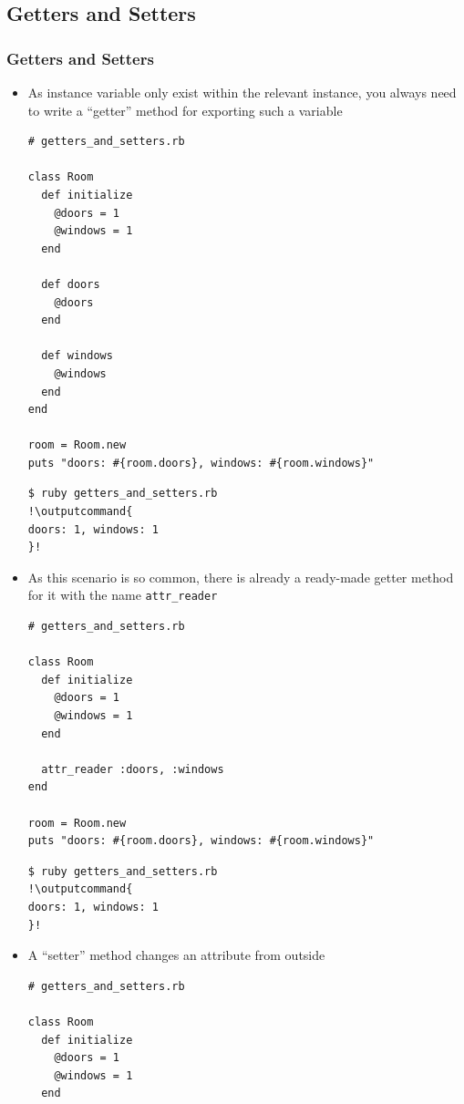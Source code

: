 \documentclass{beamer}
\newcommand{\outputcommand}[1]{\color{darkgreen}{#1}}
\begin{document}
\subsection{Getters and Setters}
\begin{frame}
\frametitle{Getters and Setters}
\begin{itemize}
 \item As instance variable only exist within the relevant instance, you always need to write a ``getter'' method for exporting such a variable
\lstset{language=Ruby, style=eclipse}
\begin{lstlisting}[escapechar=&]
# getters_and_setters.rb

class Room
  def initialize
    @doors = 1
    @windows = 1
  end

  def doors
    @doors
  end

  def windows
    @windows
  end
end

room = Room.new
puts "doors: #{room.doors}, windows: #{room.windows}"
\end{lstlisting}
\lstset{language=shell}
\begin{lstlisting}[numbers=none, escapechar=!]
$ ruby getters_and_setters.rb
!\outputcommand{
doors: 1, windows: 1
}!
\end{lstlisting}
\item As this scenario is so common, there is already a ready-made getter method for it with the name \texttt{attr\_reader}
\lstset{language=Ruby, style=eclipse}
\begin{lstlisting}[escapechar=&]
# getters_and_setters.rb

class Room
  def initialize
    @doors = 1
    @windows = 1
  end

  attr_reader :doors, :windows
end

room = Room.new
puts "doors: #{room.doors}, windows: #{room.windows}"
\end{lstlisting}
\lstset{language=shell}
\begin{lstlisting}[numbers=none, escapechar=!]
$ ruby getters_and_setters.rb
!\outputcommand{
doors: 1, windows: 1
}!
\end{lstlisting}

\item A ``setter'' method changes an attribute from outside
\lstset{language=Ruby, style=eclipse}
\begin{lstlisting}[escapechar=&]
# getters_and_setters.rb

class Room
  def initialize
    @doors = 1
    @windows = 1
  end


\end{lstlisting}
\end{itemize}
\end{frame}
\end{document}
